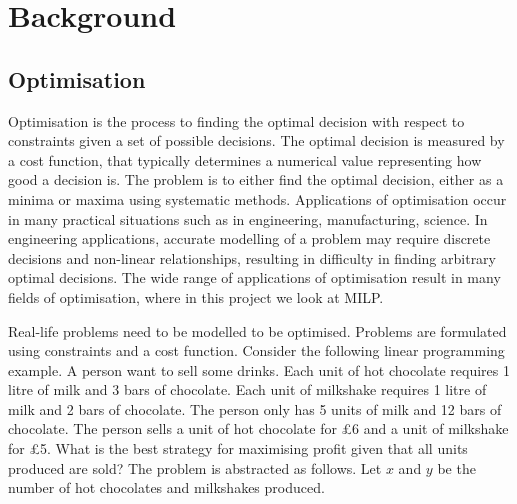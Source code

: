 \chapter{Background}

\section{Optimisation}

Optimisation is the process to finding the optimal decision with respect to constraints given a set of possible decisions. The optimal decision is measured by a cost function, that typically determines a numerical value representing how good a decision is. The problem is to either find the optimal decision, either as a minima or maxima using systematic methods. Applications of optimisation occur in many practical situations such as in engineering, manufacturing, science. In engineering applications, accurate modelling of a problem may require discrete decisions and non-linear relationships, resulting in difficulty in finding arbitrary optimal decisions. The wide range of applications of optimisation result in  many fields of optimisation, where in this project we look at MILP.
\begin{center}
\end{center}
Real-life problems need to be modelled to be optimised. Problems are formulated using constraints and a cost function. Consider the following linear programming example. A person want to sell some drinks. Each unit of hot chocolate requires 1 litre of milk and 3 bars of chocolate. Each unit of milkshake requires 1 litre of milk and 2 bars of chocolate. The person only has 5 units of milk and 12 bars of chocolate. The person sells a unit of hot chocolate for £6 and a unit of milkshake for £5. What is the best strategy for maximising profit given that all units produced are sold? The problem is abstracted as follows. Let $x$ and $y$ be the number of hot chocolates and milkshakes produced.
